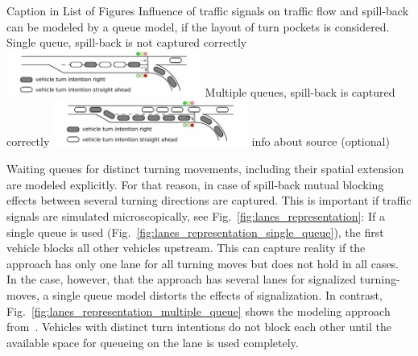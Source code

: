 \createfigure%
{Caption in List of Figures}%
{Influence of traffic signals on traffic flow and spill-back can be modeled by a queue model, if the layout of turn pockets is considered.}
{\label{fig:lanes_representation}}%
{%
  \createsubfigure%
	{Single queue, spill-back is not captured correctly}%
	{\includegraphics[width=0.48\textwidth]{extending/figures/signalslanes/single_queue_model_inkscape.pdf}}%
	{\label{fig:lanes_representation_single_queue}}%
  \createsubfigure%
	{Multiple queues, spill-back is captured correctly}%
	{\includegraphics[width=0.48\textwidth]{extending/figures/signalslanes/multiple_queue_model_inkscape.pdf}}%
	{\label{fig:lanes_representation_multiple_queue}}%
}%
{info about source (optional)}



Waiting queues for distinct turning movements, including their spatial extension are modeled explicitly. 
For that reason, in case of spill-back mutual blocking effects between several turning directions are captured.
This is important if traffic signals are simulated microscopically, see Fig.~\ref{fig:lanes_representation}: If a single queue is used (Fig.~\ref{fig:lanes_representation_single_queue}), the first vehicle blocks all other vehicles upstream. 
This can capture reality if the approach has only one lane for all turning moves but does not hold in all cases. 
In the case, however, that the approach has several lanes for signalized turning-moves, a single queue model distorts the effects of signalization. 
In contrast, Fig.~\ref{fig:lanes_representation_multiple_queue} shows the modeling approach from~\cite{CremerLandenfeld1998MesoTrafficSignalModel}. Vehicles with distinct turn intentions do not block each other until the available space for queueing on the lane is used completely.




